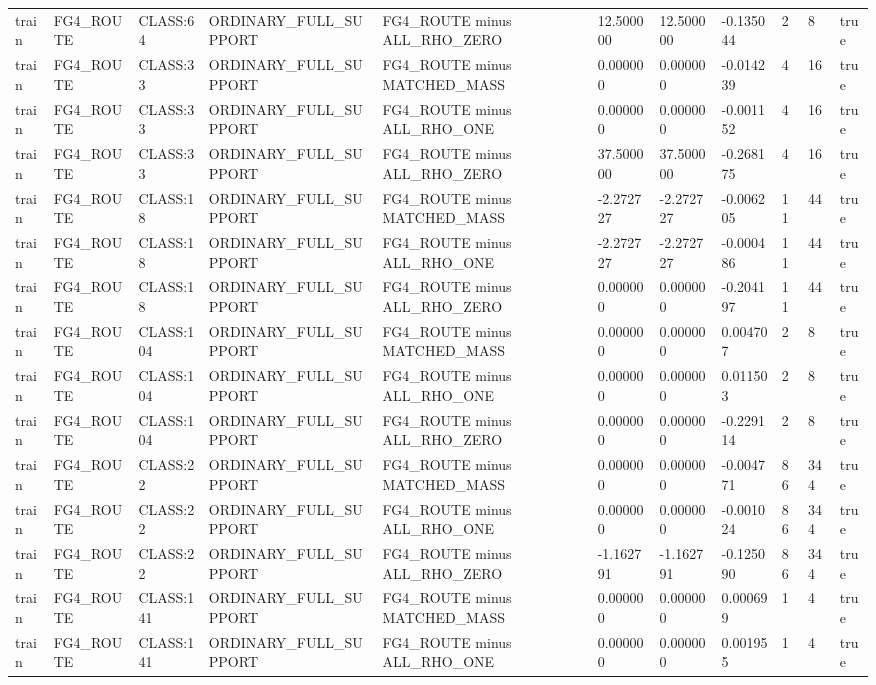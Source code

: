 \begin{tabular}{lllllllllll}
train & FG4\_ROUTE & CLASS:64 & ORDINARY\_FULL\_SUPPORT & FG4\_ROUTE minus ALL\_RHO\_ZERO & 12.500000 & 12.500000 & -0.135044 & 2 & 8 & true \\
train & FG4\_ROUTE & CLASS:33 & ORDINARY\_FULL\_SUPPORT & FG4\_ROUTE minus MATCHED\_MASS & 0.000000 & 0.000000 & -0.014239 & 4 & 16 & true \\
train & FG4\_ROUTE & CLASS:33 & ORDINARY\_FULL\_SUPPORT & FG4\_ROUTE minus ALL\_RHO\_ONE & 0.000000 & 0.000000 & -0.001152 & 4 & 16 & true \\
train & FG4\_ROUTE & CLASS:33 & ORDINARY\_FULL\_SUPPORT & FG4\_ROUTE minus ALL\_RHO\_ZERO & 37.500000 & 37.500000 & -0.268175 & 4 & 16 & true \\
train & FG4\_ROUTE & CLASS:18 & ORDINARY\_FULL\_SUPPORT & FG4\_ROUTE minus MATCHED\_MASS & -2.272727 & -2.272727 & -0.006205 & 11 & 44 & true \\
train & FG4\_ROUTE & CLASS:18 & ORDINARY\_FULL\_SUPPORT & FG4\_ROUTE minus ALL\_RHO\_ONE & -2.272727 & -2.272727 & -0.000486 & 11 & 44 & true \\
train & FG4\_ROUTE & CLASS:18 & ORDINARY\_FULL\_SUPPORT & FG4\_ROUTE minus ALL\_RHO\_ZERO & 0.000000 & 0.000000 & -0.204197 & 11 & 44 & true \\
train & FG4\_ROUTE & CLASS:104 & ORDINARY\_FULL\_SUPPORT & FG4\_ROUTE minus MATCHED\_MASS & 0.000000 & 0.000000 & 0.004707 & 2 & 8 & true \\
train & FG4\_ROUTE & CLASS:104 & ORDINARY\_FULL\_SUPPORT & FG4\_ROUTE minus ALL\_RHO\_ONE & 0.000000 & 0.000000 & 0.011503 & 2 & 8 & true \\
train & FG4\_ROUTE & CLASS:104 & ORDINARY\_FULL\_SUPPORT & FG4\_ROUTE minus ALL\_RHO\_ZERO & 0.000000 & 0.000000 & -0.229114 & 2 & 8 & true \\
train & FG4\_ROUTE & CLASS:22 & ORDINARY\_FULL\_SUPPORT & FG4\_ROUTE minus MATCHED\_MASS & 0.000000 & 0.000000 & -0.004771 & 86 & 344 & true \\
train & FG4\_ROUTE & CLASS:22 & ORDINARY\_FULL\_SUPPORT & FG4\_ROUTE minus ALL\_RHO\_ONE & 0.000000 & 0.000000 & -0.001024 & 86 & 344 & true \\
train & FG4\_ROUTE & CLASS:22 & ORDINARY\_FULL\_SUPPORT & FG4\_ROUTE minus ALL\_RHO\_ZERO & -1.162791 & -1.162791 & -0.125090 & 86 & 344 & true \\
train & FG4\_ROUTE & CLASS:141 & ORDINARY\_FULL\_SUPPORT & FG4\_ROUTE minus MATCHED\_MASS & 0.000000 & 0.000000 & 0.000699 & 1 & 4 & true \\
train & FG4\_ROUTE & CLASS:141 & ORDINARY\_FULL\_SUPPORT & FG4\_ROUTE minus ALL\_RHO\_ONE & 0.000000 & 0.000000 & 0.001955 & 1 & 4 & true \\

\end{tabular}
